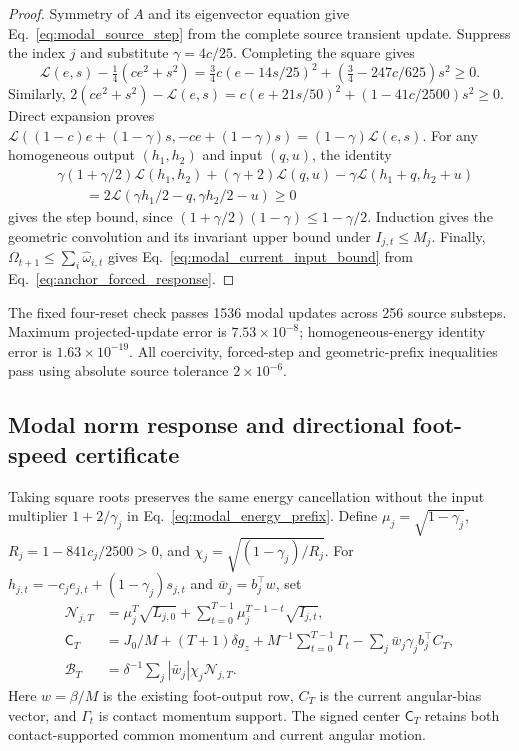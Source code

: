 \begin{proof}
Symmetry of $A$ and its eigenvector equation give Eq.~\eqref{eq:modal_source_step} from the complete source transient update.
Suppress the index $j$ and substitute $\gamma=4c/25$.
Completing the square gives
\begin{equation}
 \mathcal L(e,s)-\tfrac14(ce^2+s^2)
 =\tfrac34c(e-14s/25)^2+(\tfrac34-247c/625)s^2\ge0.
\end{equation}
Similarly, $2(ce^2+s^2)-\mathcal L(e,s)=c(e+21s/50)^2+(1-41c/2500)s^2\ge0$.
Direct expansion proves $\mathcal L((1-c)e+(1-\gamma)s,-ce+(1-\gamma)s)=(1-\gamma)\mathcal L(e,s)$.
For any homogeneous output $(h_1,h_2)$ and input $(q,u)$, the identity
\begin{align}
 &\gamma(1+\gamma/2)\mathcal L(h_1,h_2)+(\gamma+2)\mathcal L(q,u)
   -\gamma\mathcal L(h_1+q,h_2+u)\nonumber\\
 &\hspace{2em}=2\mathcal L(\gamma h_1/2-q,\gamma h_2/2-u)\ge0
\end{align}
gives the step bound, since $(1+\gamma/2)(1-\gamma)\le1-\gamma/2$.
Induction gives the geometric convolution and its invariant upper bound under $I_{j,t}\le M_j$.
Finally, $\Omega_{t+1}\le\sum_i\widehat\omega_{i,t}$ gives Eq.~\eqref{eq:modal_current_input_bound} from Eq.~\eqref{eq:anchor_forced_response}.
\end{proof}

The fixed four-reset check passes 1536 modal updates across 256 source substeps.
Maximum projected-update error is $7.53\times10^{-8}$; homogeneous-energy identity error is $1.63\times10^{-19}$.
All coercivity, forced-step and geometric-prefix inequalities pass using absolute source tolerance $2\times10^{-6}$.

\subsection{Modal norm response and directional foot-speed certificate}
\label{app:modal_foot}

Taking square roots preserves the same energy cancellation without the input multiplier $1+2/\gamma_j$ in Eq.~\eqref{eq:modal_energy_prefix}.
Define $\mu_j=\sqrt{1-\gamma_j}$, $R_j=1-841c_j/2500>0$, and $\chi_j=\sqrt{(1-\gamma_j)/R_j}$.
For $h_{j,t}=-c_je_{j,t}+(1-\gamma_j)s_{j,t}$ and $\bar w_j=b_j^\top w$, set
\begin{align}
 \mathcal N_{j,T}&=\mu_j^T\sqrt{L_{j,0}}+
   \sum_{t=0}^{T-1}\mu_j^{T-1-t}\sqrt{I_{j,t}},\nonumber\\
 \mathsf C_T&=J_0/M+(T+1)\delta g_z+
   M^{-1}\sum_{t=0}^{T-1}\Gamma_t-
   \sum_j\bar w_j\gamma_j b_j^\top C_T,\nonumber\\
 \mathcal B_T&=\delta^{-1}\sum_j|\bar w_j|\chi_j\mathcal N_{j,T}.
 \label{eq:modal_foot_budget}
\end{align}
Here $w=\beta/M$ is the existing foot-output row, $C_T$ is the current angular-bias vector, and $\Gamma_t$ is contact momentum support.
The signed center $\mathsf C_T$ retains both contact-supported common momentum and current angular motion.

